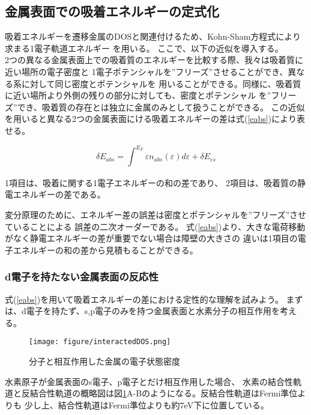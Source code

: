 \documentclass[12pt]{ltjsarticle}
\begin{document}
\subsection{金属表面での吸着エネルギーの定式化}
吸着エネルギーを遷移金属のDOSと関連付けるため、Kohn-Sham方程式により求まる1電子軌道エネルギー
を用いる。
ここで、以下の近似を導入する。\\
2つの異なる金属表面上での吸着質のエネルギーを比較する際、我々は吸着質に近い場所の電子密度と
1電子ポテンシャルを”フリーズ”させることができ、異なる系に対して同じ密度とポテンシャルを
用いることができる。同様に、吸着質に近い場所より外側の残りの部分に対しても、密度とポテンシャル
を”フリーズ”でき、吸着質の存在とは独立に金属のみとして扱うことができる。
この近似を用いると異なる2つの金属表面にける吸着エネルギーの差は式(\ref{eabs})により表せる。

\begin{equation}
    \label{eabs}
    \delta E_{abs} = \int_{}^{E_F} \varepsilon n_{abs}(\varepsilon) d\varepsilon + 
    \delta E_{es}
\end{equation}

1項目は、吸着に関する1電子エネルギーの和の差であり、
2項目は、吸着質の静電エネルギーの差である。

変分原理のために、エネルギー差の誤差は密度とポテンシャルを”フリーズ”させていることによる
誤差の二次オーダーである。
式(\ref{eabs})より、大きな電荷移動がなく静電エネルギーの差が重要でない場合は障壁の大きさの
違いは1項目の電子エネルギーの和の差から見積もることができる。

\subsubsection{d電子を持たない金属表面の反応性}
式(\ref{eabs})を用いて吸着エネルギーの差における定性的な理解を試みよう。
まずは、d電子を持たず、s,p電子のみを持つ金属表面と水素分子の相互作用を考える。

\begin{figure}[hbtp]
    \begin{center}
     \texttt{[image: figure/interactedDOS.png]}
    \end{center}
    \caption{分子と相互作用した金属の電子状態密度}
    \label{fig:interactedDOS}
\end{figure}

水素原子が金属表面のs電子、p電子とだけ相互作用した場合、
水素の結合性軌道と反結合性軌道の概略図は図\ref{fig:interactedDOS}A-Bのようになる。反結合性軌道はFermi準位よりも
少し上、結合性軌道はFermi準位よりも約7eV下に位置している。
\end{document}
